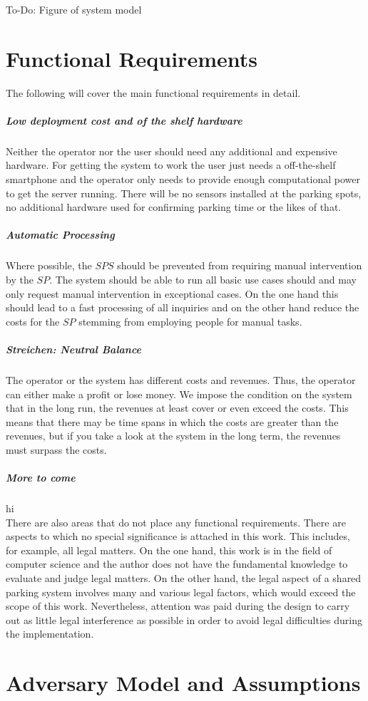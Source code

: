 To-Do: Figure of system model

\section{Functional Requirements}
The following will cover the main functional requirements in detail.
\subparagraph{Low deployment cost and of the shelf hardware} Neither the operator nor the user should need any additional and expensive hardware. For getting the system to work the user just needs a off-the-shelf smartphone and the operator only needs to provide enough computational power to get the server running. There will be no sensors installed at the parking spots, no additional hardware used for confirming parking time or the likes of that.
\subparagraph{Automatic Processing} Where possible, the $SPS$ should be prevented from requiring manual intervention by the $SP$. The system should be able to run all basic use cases should and may only request manual intervention in exceptional cases. On the one hand this should lead to a fast processing of all inquiries and on the other hand reduce the costs for the $SP$ stemming from employing people for manual tasks.
\subparagraph{Streichen: Neutral Balance} The operator or the system has different costs and revenues. Thus, the operator can either make a profit or lose money. We impose the condition on the system that in the long run, the revenues at least cover or even exceed the costs. This means that there may be time spans in which the costs are greater than the revenues, but if you take a look at the system in the long term, the revenues must surpass the costs.

\subparagraph{More to come}hi\\

There are also areas that do not place any functional requirements. There are aspects to which no special significance is attached in this work. This includes, for example, all legal matters. On the one hand, this work is in the field of computer science and the author does not have the fundamental knowledge to evaluate and judge legal matters. On the other hand, the legal aspect of a shared parking system involves many and various legal factors, which would exceed the scope of this work. Nevertheless, attention was paid during the design to carry out as little legal interference as possible in order to avoid legal difficulties during the implementation.

\section{Adversary Model and Assumptions}

